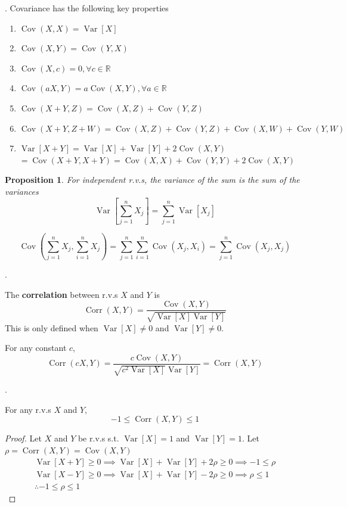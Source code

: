 \documentclass[8pt]{beamer}
\newtheorem{proposition}[theorem]{Proposition}
\newcommand{\mbb}[1]{\mathbb{#1}}
\newcommand{\tb}[1]{\textbf{#1}}
\newcommand{\Var}[1]{\operatorname{Var}\left[#1\right]}
\newcommand{\Cov}[2]{\operatorname{Cov}\!\left(#1, #2\right)}
\newcommand{\Corr}[2]{\operatorname{Corr}\!\left(#1, #2\right)}
\begin{document}
\begin{frame}{.}
    Covariance has the following key properties

    \begin{enumerate}
        \item $\Cov{X}{X} = \Var{X}$
        \item $\Cov{X}{Y} = \Cov{Y}{X}$
        \item $\Cov{X}{c} = 0, \forall c \in \mbb{R}$
        \item $\Cov{aX}{Y} = a\Cov{X}{Y}, \forall a \in \mbb{R}$
        \item $\Cov{X+Y}{Z}=\Cov{X}{Z}+\Cov{Y}{Z}$
        \item $\Cov{X+Y}{Z+W} = \Cov{X}{Z}+\Cov{Y}{Z}+\Cov{X}{W}+\Cov{Y}{W}$
        \item $\Var{X+Y} = \Var{X}+\Var{Y}+2\Cov{X}{Y}$
        $= \Cov{X+Y}{X+Y} = \Cov{X}{X}+ \Cov{Y}{Y} + 2\Cov{X}{Y}$
    \end{enumerate}

    \begin{proposition}
        For independent r.v.s, the variance of the sum is the sum of the variances
        \[
            \Var{\sum_{j=1}^n X_j} = \sum_{j=1}^n \Var{X_j} 
        \]
    \end{proposition}
    \[
    \Cov{\sum_{j=1}^n X_j}{\sum_{i=1}^n X_j} = \sum_{j=1}^n \sum_{i=1}^n\Cov{X_j}{X_i} = \sum_{j=1}^n \Cov{X_j}{X_j}
    \]
\end{frame}

\begin{frame}{.}
    \begin{definition}[Correlation]
        The \tb{correlation} between r.v.s $X$ and $Y$ is
        \[
            \Corr{X}{Y} = \frac{\Cov{X}{Y}}{\sqrt{\Var{X} \Var{Y}}}
        \]
        This is only defined when $\Var{X} \neq 0$ and $\Var{Y} \neq 0$.
    \end{definition}
    For any constant $c$,
        \[
            \Corr{cX}{Y} = \frac{c\Cov{X}{Y}}{\sqrt{c^2 \Var{X}}{\Var{Y}}} = \Corr{X}{Y}
        \]
\end{frame}

\begin{frame}{.}
    \begin{theorem}
        For any r.v.s $X$ and $Y$,
        \[
        -1 \leq \Corr{X}{Y} \leq 1
        \]
    \end{theorem}
    \begin{proof}
        Let $X$ and $Y$ be r.v.s s.t. $\Var{X} =1$ and $\Var{Y} =1$. Let $\rho = \Corr{X}{Y} = \Cov{X}{Y}$
        \[
        \begin{aligned}
            \Var{X+Y} \geq 0 \implies \Var{X} + \Var{Y} + 2\rho \geq 0 \implies -1\leq \rho\\
            \Var{X-Y} \geq 0 \implies \Var{X}+\Var{Y} - 2\rho \geq 0 \implies \rho \leq 1 \\
            \therefore -1 \leq \rho \leq 1
        \end{aligned}
        \]
    \end{proof}
\end{frame}
\end{document}
